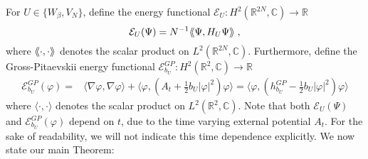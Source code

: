 \documentclass[11pt, english, american]{article}
\newcommand{\laa}{\langle\hspace{-0.08cm}\langle}
\newcommand{\raa}{\rangle\hspace{-0.08cm}\rangle}
\newcommand{\LZ}{L^2(\mathbb{R}^2,\mathbb{C})}
\newcommand{\LZN}{L^2(\mathbb{R}^{2N},\mathbb{C})}
\renewcommand{\phi}{\varphi}
\begin{document}
For $U \in \lbrace W_\beta, V_N \rbrace$,  define the energy functional $\mathcal{E}_{U}:H^2(\mathbb{R}^ {2N}, \mathbb{C})\to \mathbb{R}$
$$
\mathcal{E}_{U}(\Psi)=N^{-1}\laa\Psi,H_{U}\Psi\raa\;,$$
where $\laa\cdot,\cdot\raa$ denotes the scalar product on $\LZN$.
Furthermore, define the
Gross-Pitaevskii energy functional $\mathcal{E}_{b_U}^{GP}:H^2(\mathbb{R}^ {2}, \mathbb{C})\to \mathbb{R}$  \begin{align}\label{energyfunct}
\mathcal{E}_{b_U}^{GP}(\phi)=&\langle\nabla\phi,\nabla\phi\rangle+\langle\phi,(A_t+\frac{1}{2} b_U|\phi|^2)\phi\rangle
%
=\langle\phi,
(h_{b_U}^{GP}-\frac{1}{2} b_U |\phi|^2)\phi\rangle
\end{align}
where $\langle\cdot,\cdot\rangle$ denotes the scalar product on $\LZ$.
Note that both $\mathcal{E}_{U}(\Psi) $  and $\mathcal{E}_{b_U}^{GP}(\phi)$ depend on $t$, due to the time varying external potential $A_t$. 
For the sake of readability, we will not indicate this time dependence explicitly.
We now state our main Theorem:
\end{document}
